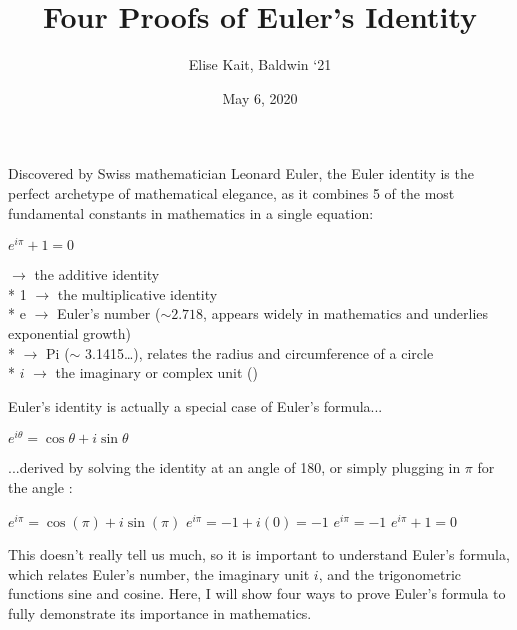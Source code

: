\documentclass{article}
\theoremstyle{definition}
\begin{document}
\title{Four Proofs of Euler's Identity}
\author{Elise Kait, Baldwin ‘21}
\date{May 6, 2020}
\maketitle

\noindent
Discovered by Swiss mathematician Leonard Euler, the Euler identity is the perfect archetype of mathematical elegance, as it combines 5 of the most fundamental constants in mathematics in a single equation:

\begin{center}
$e^{i\pi}+1=0$
\end{center}


 $\rightarrow$ the additive identity
\\* 1 $\rightarrow$ the multiplicative identity
\\* e $\rightarrow$ Euler’s number ($\sim 2.718$, appears widely in mathematics and underlies exponential growth)
\\* \pi $\rightarrow$ Pi ($\sim$ 3.1415…), relates the radius and circumference of a circle
\\* $i$ $\rightarrow$ the imaginary or complex unit ()

\vspace{5mm} %
\noindent
Euler’s identity is actually a special case of Euler’s formula...

\begin{center}
$e^{i\theta}=\cos\theta + i\sin\theta$
\end{center}


\noindent
...derived by solving the identity at an angle of 180\degree, or simply plugging in $\pi$ for the angle \theta:

\begin{center}
$e^{i\pi}=\cos(\pi) + i\sin(\pi)$
$e^{i\pi}=-1+i(0)=-1$
$e^{i\pi}=-1$
$e^{i\pi}+1=0$
\end{center}

\noindent
This doesn’t really tell us much, so it is important to understand Euler’s formula, which relates Euler’s number, the imaginary unit $i$, and the trigonometric functions sine and cosine. Here, I will show four ways to prove Euler’s formula to fully demonstrate its importance in mathematics.
\end{document}
